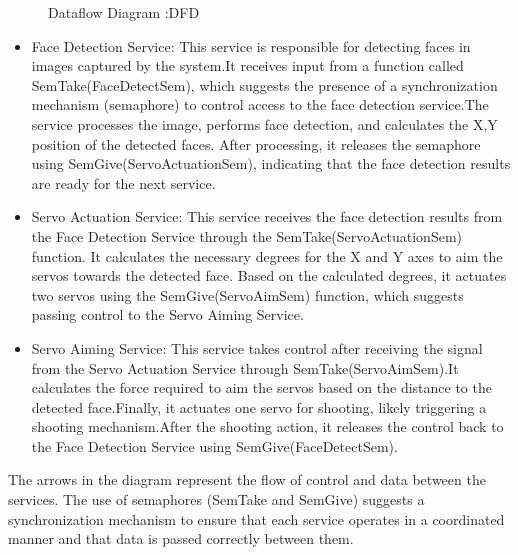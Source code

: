 \documentclass[a4paper,11pt]{article}%
\newenvironment{qanda}{\setlength{\parindent}{0pt}}{\bigskip}
\begin{document}
\begin{qanda}
\begin{enumerate}
\begin{figure}[H]
				\caption{Dataflow Diagram :DFD}
			\end{figure}
			\begin{itemize}
				\item[]Face Detection Service: This service is responsible for detecting faces in images captured by the system.It receives input from a function called SemTake(FaceDetectSem), which suggests the presence of a synchronization mechanism (semaphore) to control access to the face detection service.The service processes the image, performs face detection, and calculates the X,Y position of the detected faces.
				After processing, it releases the semaphore using SemGive(ServoActuationSem), indicating that the face detection results are ready for the next service.
				\item[] Servo Actuation Service:
					This service receives the face detection results from the Face Detection Service through the SemTake(ServoActuationSem) function. It calculates the necessary degrees for the X and Y axes to aim the servos towards the detected face. Based on the calculated degrees, it actuates two servos using the SemGive(ServoAimSem) function, which suggests passing control to the Servo Aiming Service.
				\item[] Servo Aiming Service:
					This service takes control after receiving the signal from the Servo Actuation Service through SemTake(ServoAimSem).It calculates the force required to aim the servos based on the distance to the detected face.Finally, it actuates one servo for shooting, likely triggering a shooting mechanism.After the shooting action, it releases the control back to the Face Detection Service using SemGive(FaceDetectSem).
			\end{itemize}
			The arrows in the diagram represent the flow of control and data between the services. The use of semaphores (SemTake and SemGive) suggests a synchronization mechanism to ensure that each service operates in a coordinated manner and that data is passed correctly between them.


	\end{enumerate}

\end{qanda}
\end{document}
